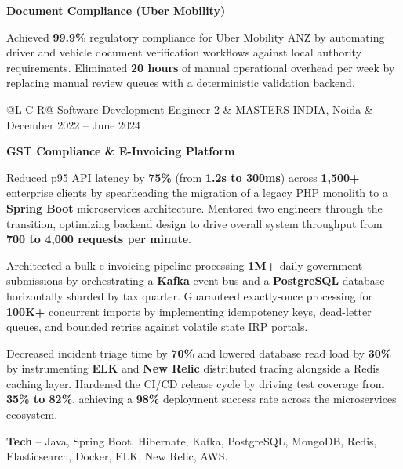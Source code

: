 \textcolor{Project}{\textbf{Document Compliance (Uber Mobility)}}
\vspace{-0.8ex}
\begin{zitemize}
    \item Achieved \textbf{99.9\%} regulatory compliance for Uber Mobility ANZ by automating driver and vehicle document verification workflows against local authority requirements. Eliminated \textbf{20 hours} of manual operational overhead per week by replacing manual review queues with a deterministic validation backend.
\end{zitemize}

\noindent
\begin{tabularx}{\textwidth}{@{}L C R@{}}
\textcolor{role}{Software Development Engineer 2} & \textcolor{company}{MASTERS INDIA, Noida} & \textcolor{date}{December 2022 -- June 2024}\\
\end{tabularx}
\vspace{-1.6ex}

\textcolor{Project}{\textbf{GST Compliance \& E-Invoicing Platform}}
\vspace{-0.8ex}
\begin{zitemize}
    \item Reduced p95 API latency by \textbf{75\%} (from \textbf{1.2s to 300ms}) across \textbf{1,500+} enterprise clients by spearheading the migration of a legacy PHP monolith to a \textbf{Spring Boot} microservices architecture. Mentored two engineers through the transition, optimizing backend design to drive overall system throughput from \textbf{700 to 4,000 requests per minute}.
    \item Architected a bulk e-invoicing pipeline processing \textbf{1M+} daily government submissions by orchestrating a \textbf{Kafka} event bus and a \textbf{PostgreSQL} database horizontally sharded by tax quarter. Guaranteed exactly-once processing for \textbf{100K+} concurrent imports by implementing idempotency keys, dead-letter queues, and bounded retries against volatile state IRP portals.
    \item Decreased incident triage time by \textbf{70\%} and lowered database read load by \textbf{30\%} by instrumenting \textbf{ELK} and \textbf{New Relic} distributed tracing alongside a Redis caching layer. Hardened the CI/CD release cycle by driving test coverage from \textbf{35\% to 82\%}, achieving a \textbf{98\%} deployment success rate across the microservices ecosystem.
    \item \textbf{Tech} -- Java, Spring Boot, Hibernate, Kafka, PostgreSQL, MongoDB, Redis, Elasticsearch, Docker, ELK, New Relic, AWS.
\end{zitemize}

